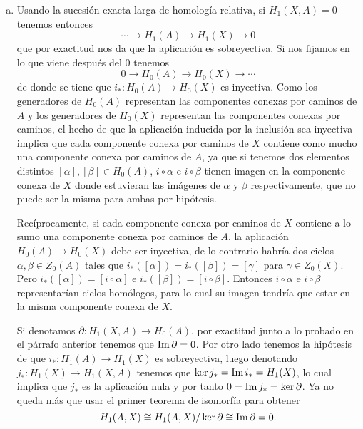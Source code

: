 \documentclass[twoside]{article}
\begin{document}
\begin{solucion}
\begin{enumerate}[(a)]
\item Usando la sucesión exacta larga de homología relativa, si $H_1(X,A)=0$ tenemos entonces
\[
\cdots\to H_1(A)\to H_1(X)\to 0
\]
que por exactitud nos da que la aplicación es sobreyectiva. Si nos fijamos en lo que viene después del 0 tenemos
\[
0\to H_0(A)\to H_0(X)\to\cdots
\]
de donde se tiene que $i_*:H_0(A)\to H_0(X)$ es inyectiva. Como los generadores de $H_0(A)$ representan las componentes conexas por caminos de $A$ y los generadores de $H_0(X)$ representan las componentes conexas por caminos, el hecho de que la aplicación inducida por la inclusión sea inyectiva implica que cada componente conexa por caminos de $X$ contiene como mucho una componente conexa por caminos de $A$, ya que si tenemos dos elementos distintos $[\alpha],[\beta]\in H_0(A)$, $i\circ\alpha$ e $i\circ\beta$ tienen imagen en la componente conexa de $X$ donde estuvieran las imágenes de $\alpha$ y $\beta$ respectivamente, que no puede ser la misma para ambas por hipótesis. 

Recíprocamente, si cada componente conexa por caminos de $X$ contiene a lo sumo una componente conexa por caminos de $A$, la aplicación $H_0(A)\to H_0(X)$ debe ser inyectiva, de lo contrario habría dos ciclos $\alpha,\beta\in Z_0(A)$ tales que $i_*([\alpha])=i_*([\beta])=[\gamma]$ para $\gamma\in Z_0(X)$. Pero $i_*([\alpha])=[i\circ\alpha]$ e $i_*([\beta])=[i\circ\beta]$. Entonces $i\circ\alpha$ e $i\circ\beta$ representarían ciclos homólogos, para lo cual su imagen tendría que estar en la misma componente conexa de $X$. 

Si denotamos $\partial:H_1(X,A)\to H_0(A)$, por exactitud junto a lo probado en el párrafo anterior tenemos que $\operatorname{Im}\partial=0$. Por otro lado tenemos la hipótesis de que $i_*:H_1(A)\to H_1(X)$ es sobreyectiva, luego denotando $j_*:H_1(X)\to H_1(X,A)$ tenemos que $\ker j_*=\operatorname{Im} i_*=H_1(X)$, lo cual implica que $j_*$ es la aplicación nula y por tanto $0=\operatorname{Im} j_*=\ker\partial$. Ya no queda más que usar el primer teorema de isomorfía para obtener $$H_1(A,X)\cong H_1(A,X)/\ker\partial\cong \operatorname{Im}\partial=0.$$
\end{enumerate}
\end{solucion}

\newpage
\end{document}
